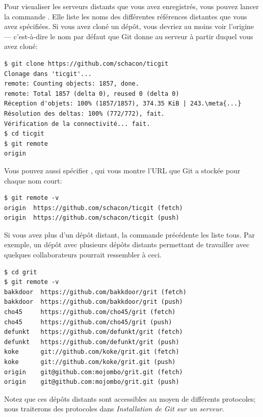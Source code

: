 Pour visualiser les serveurs distants que vous avez enregistrés, vous pouvez lancer la commande .
Elle liste les noms des différentes références distantes que vous avez spécifiées.
Si vous avez cloné un dépôt, vous devriez au moins voir l'origine  --- c'est-à-dire le nom par défaut que Git donne au serveur à partir duquel vous avez cloné:
\begin{Schunk}
\begin{Verbatim}[commandchars=\\\{\}]
$ git clone https://github.com/schacon/ticgit
Clonage dans 'ticgit'...
remote: Counting objects: 1857, done.
remote: Total 1857 (delta 0), reused 0 (delta 0)
Réception d'objets: 100% (1857/1857), 374.35 KiB | 243.\meta{...}
Résolution des deltas: 100% (772/772), fait.
Vérification de la connectivité... fait.
$ cd ticgit
$ git remote
origin
\end{Verbatim}
\end{Schunk}

Vous pouvez aussi spécifier , qui vous montre l'URL que Git a stockée pour chaque nom court:
\begin{Schunk}
\begin{Verbatim}
$ git remote -v
origin	https://github.com/schacon/ticgit (fetch)
origin	https://github.com/schacon/ticgit (push)
\end{Verbatim}
\end{Schunk}

Si vous avez plus d'un dépôt distant, la commande précédente les liste tous.
Par exemple, un dépôt avec plusieurs dépôts distants permettant de travailler avec quelques collaborateurs pourrait ressembler à ceci.
\begin{Schunk}
\begin{Verbatim}
$ cd grit
$ git remote -v
bakkdoor  https://github.com/bakkdoor/grit (fetch)
bakkdoor  https://github.com/bakkdoor/grit (push)
cho45     https://github.com/cho45/grit (fetch)
cho45     https://github.com/cho45/grit (push)
defunkt   https://github.com/defunkt/grit (fetch)
defunkt   https://github.com/defunkt/grit (push)
koke      git://github.com/koke/grit.git (fetch)
koke      git://github.com/koke/grit.git (push)
origin    git@github.com:mojombo/grit.git (fetch)
origin    git@github.com:mojombo/grit.git (push)
\end{Verbatim}
\end{Schunk}

Notez que ces dépôts distants sont accessibles au moyen de différents protocoles; nous traiterons des protocoles dans \emph{Installation de Git sur un serveur}.

